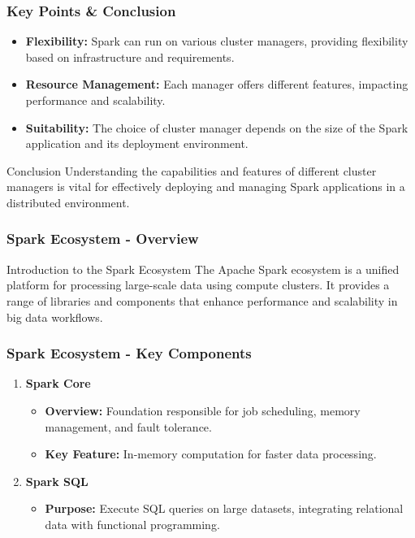 \documentclass[aspectratio=169]{beamer}
\begin{document}
\begin{frame}[fragile]
    \frametitle{Key Points & Conclusion}
    \begin{itemize}
        \item \textbf{Flexibility:} Spark can run on various cluster managers, providing flexibility based on infrastructure and requirements.
        
        \item \textbf{Resource Management:} Each manager offers different features, impacting performance and scalability.
        
        \item \textbf{Suitability:} The choice of cluster manager depends on the size of the Spark application and its deployment environment.
    \end{itemize}
    
    \begin{block}{Conclusion}
        Understanding the capabilities and features of different cluster managers is vital for effectively deploying and managing Spark applications in a distributed environment.
    \end{block}
\end{frame}

\begin{frame}[fragile]
    \frametitle{Spark Ecosystem - Overview}
    \begin{block}{Introduction to the Spark Ecosystem}
        The Apache Spark ecosystem is a unified platform for processing large-scale data using compute clusters. 
        It provides a range of libraries and components that enhance performance and scalability in big data workflows.
    \end{block}
\end{frame}

\begin{frame}[fragile]
    \frametitle{Spark Ecosystem - Key Components}
    \begin{enumerate}
        \item \textbf{Spark Core}
            \begin{itemize}
                \item \textbf{Overview:} Foundation responsible for job scheduling, memory management, and fault tolerance.
                \item \textbf{Key Feature:} In-memory computation for faster data processing.
            \end{itemize} 
        
        \item \textbf{Spark SQL}
            \begin{itemize}
                \item \textbf{Purpose:} Execute SQL queries on large datasets, integrating relational data with functional programming.
            \end{itemize}
    \end{enumerate}
\end{frame}
\end{document}
